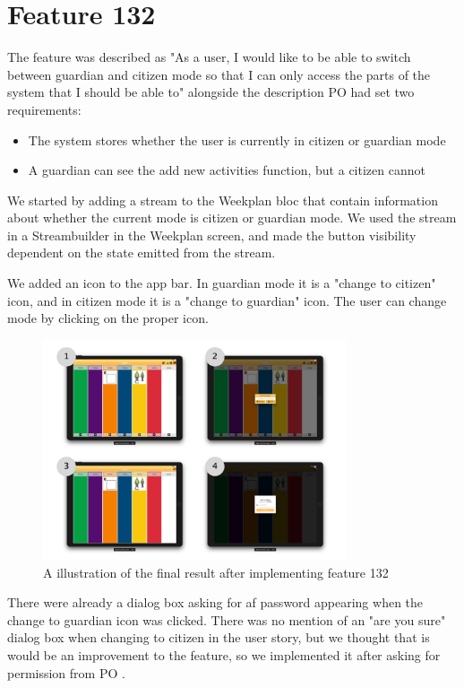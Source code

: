 \section{Feature 132}
The feature was described as "As a user, I would like to be able to switch between guardian and citizen mode so that I can only access the parts of the system that I should be able to" alongside the description \gls{PO} had set two requirements:

\begin{itemize}
  \item The system stores whether the user is currently in citizen or guardian mode
  \item A guardian can see the add new activities function, but a citizen cannot
\end{itemize}

We started by adding a stream to the Weekplan \gls{bloc} that contain information about whether the current mode is citizen or guardian mode. We used the stream in a Streambuilder in the Weekplan screen, and made the button visibility dependent on the state emitted from the stream.

We added an icon to the app bar. In guardian mode it is a "change to citizen" icon, and in citizen mode it is a "change to guardian" icon. The user can change mode by clicking on the proper icon.

\begin{figure}[h]
    \centering
    \includegraphics[width=0.8\textwidth]{figures/feature_132.pdf}
    \caption{A illustration of the final result after implementing feature 132}
    \label{fig:feature132}
\end{figure}

There were already a dialog box asking for af password appearing when the change to guardian icon was clicked. There was no mention of an "are you sure" dialog box when changing to citizen in the user story, but we thought that is would be an improvement to the feature, so we implemented it after asking for permission from \gls{PO} .


